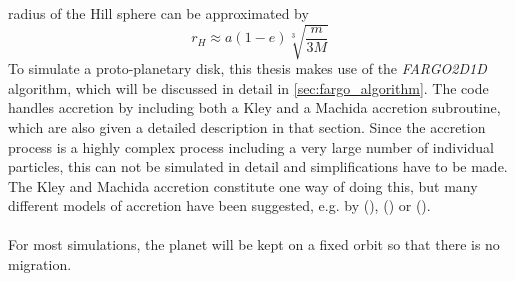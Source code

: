       radius of the Hill sphere can be approximated by
      \begin{equation}
        r_H\approx a(1-e)\sqrt[3]{\frac{m}{3M}}
        \label{eq:def_hill_radius}
      \end{equation}
      To simulate a proto-planetary disk, this thesis makes use of the 
      \textit{FARGO2D1D} algorithm, which will be discussed in detail in 
      \autoref{sec:fargo_algorithm}. The code handles accretion by 
      including both a Kley and a Machida accretion subroutine, 
      which are also given a detailed description in that section. Since the 
      accretion process is a highly complex process including a very large 
      number of individual particles, this can not be simulated in detail and 
      simplifications have to be made. The Kley and Machida accretion 
      constitute one way of doing this, but many different models of 
      accretion have been suggested, e.g. by \citeauthor{Matsumura_2017} 
      (\citeyear{Matsumura_2017}), \citeauthor{aless2018accretion}
      (\citeyear{aless2018accretion}) or \citeauthor{Schulik_2019} 
      (\citeyear{Schulik_2019}). \\ 
      \\
      For most simulations, the planet will be kept on a fixed orbit so that 
      there is no migration.
    
    \newpage
